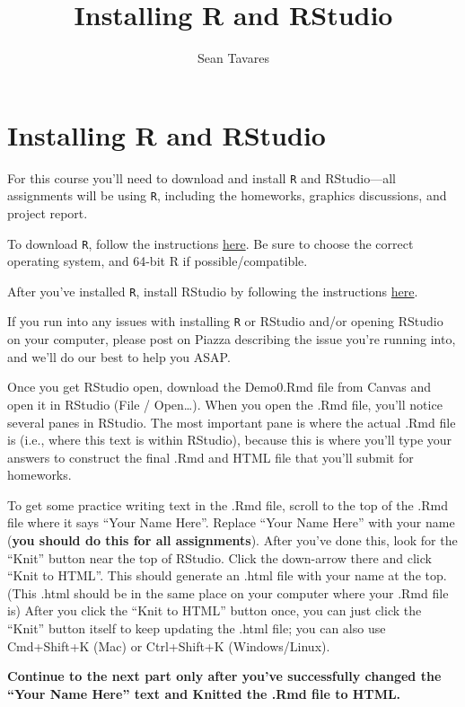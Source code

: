 \documentclass[
]{article}
\title{Installing R and RStudio}
\author{Sean Tavares}
\date{}
\begin{document}
\maketitle

\hypertarget{installing-r-and-rstudio}{%
\section{Installing R and RStudio}\label{installing-r-and-rstudio}}

For this course you'll need to download and install \texttt{R} and
RStudio---all assignments will be using \texttt{R}, including the
homeworks, graphics discussions, and project report.

To download \texttt{R}, follow the instructions
\href{https://cran.rstudio.com/}{here}. Be sure to choose the correct
operating system, and 64-bit R if possible/compatible.

After you've installed \texttt{R}, install RStudio by following the
instructions
\href{https://rstudio.com/products/rstudio/download/\#download}{here}.

If you run into any issues with installing \texttt{R} or RStudio and/or
opening RStudio on your computer, please post on Piazza describing the
issue you're running into, and we'll do our best to help you ASAP.

Once you get RStudio open, download the Demo0.Rmd file from Canvas and
open it in RStudio (File / Open\ldots). When you open the .Rmd file,
you'll notice several panes in RStudio. The most important pane is where
the actual .Rmd file is (i.e., where this text is within RStudio),
because this is where you'll type your answers to construct the final
.Rmd and HTML file that you'll submit for homeworks.

To get some practice writing text in the .Rmd file, scroll to the top of
the .Rmd file where it says ``Your Name Here''. Replace ``Your Name
Here'' with your name (\textbf{you should do this for all assignments}).
After you've done this, look for the ``Knit'' button near the top of
RStudio. Click the down-arrow there and click ``Knit to HTML''. This
should generate an .html file with your name at the top. (This .html
should be in the same place on your computer where your .Rmd file is)
After you click the ``Knit to HTML'' button once, you can just click the
``Knit'' button itself to keep updating the .html file; you can also use
Cmd+Shift+K (Mac) or Ctrl+Shift+K (Windows/Linux).

\textbf{Continue to the next part only after you've successfully changed
the ``Your Name Here'' text and Knitted the .Rmd file to HTML.}
\end{document}
